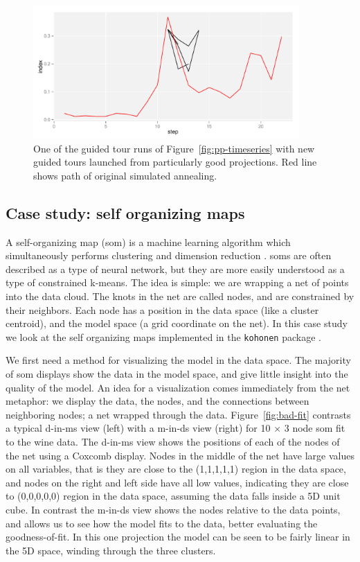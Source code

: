 \documentclass[preprint]{imsart}
\begin{document}
\begin{figure}[htbp]
  \centering
  \includegraphics[width=4in]{pp-restart}
  \caption{One of the guided tour runs of Figure~\ref{fig:pp-timeseries} with new guided tours launched from particularly good projections.  Red line shows path of original simulated annealing.}
  \label{fig:pp-multiple-starts}
\end{figure}


\subsection{Case study: self organizing maps}
\label{sub:som}

A self-organizing map ({\sc som}) is a machine learning algorithm which  simultaneously performs clustering and dimension reduction \citep{kohonen:2001}. {\sc som}s are often described as a type of neural network, but they are more easily understood as a type of constrained k-means.   The idea is simple: we are wrapping a net of points into the data cloud. The knots in the net are called nodes, and are constrained by their neighbors.  Each node has a position in the data space (like a cluster centroid), and the model space (a grid coordinate on the net).  In this case study we  look at the self organizing maps implemented in the {\tt kohonen} package \citep{kohonen}.

We first need a method for visualizing the model in the data space.  The majority of {\sc som} displays show the data in the model space, and give little insight into the quality of the model.  An idea for a visualization comes immediately from the net metaphor: we  display the data, the nodes, and the connections between neighboring nodes; a net wrapped through the data.  Figure~\ref{fig:bad-fit} contrasts a typical d-in-ms view (left) with a m-in-ds view (right) for 10 $\times$ 3 node som fit to the wine data. The d-in-ms view shows the positions of each of the nodes of the net using a Coxcomb display. Nodes in the middle of the net have large values on all variables, that is they are close to the (1,1,1,1,1) region in the data space, and nodes on the right and left side have all low values, indicating they are close to (0,0,0,0,0) region  in the data space, assuming the data falls inside a 5D unit cube. In contrast the m-in-ds view shows the nodes relative to the data points, and allows us to see how the model fits to the data, better evaluating the goodness-of-fit. In this one projection the model can be seen to be fairly linear in the 5D space, winding through the three clusters.
\end{document}
